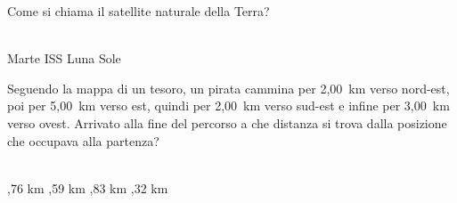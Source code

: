 \documentclass[a4paper,11pt]{exam}
\begin{document}
\begin{questions}
    
\question Come si chiama il satellite naturale della Terra?\\\
\begin{oneparchoices}
  \choice Marte
  \choice ISS
  \choice Luna
  \choice Sole
\end{oneparchoices}

    
\question Seguendo la mappa di un tesoro, un pirata cammina per 2,00~km verso nord-est, poi per 5,00~km verso est, quindi per 2,00~km verso sud-est e infine per 3,00~km verso ovest. Arrivato alla fine del percorso a che distanza si trova dalla posizione che occupava alla partenza?\\\
\begin{oneparchoices}
  ,76 km
  \choice 4,59 km
  \choice 4,83 km
  ,32 km
\end{oneparchoices}

    
\end{questions}

    
    \newpage
    
    
\end{document}

